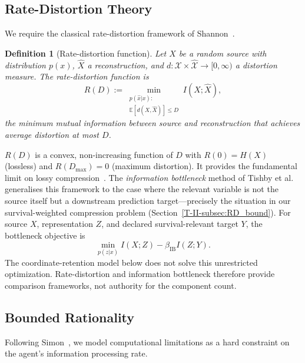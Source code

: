 \documentclass[12pt,a4paper,openany]{book}
\newtheorem{definition}[theorem]{Definition}
\begin{document}
\subsection{Rate-Distortion Theory}
\label{T-II-subsec:RD}

We require the classical rate-distortion framework
of Shannon~\cite{Shannon1959}.

\begin{definition}[Rate-distortion function]
\label{T-II-def:RD}
Let $X$ be a random source with distribution $p(x)$,
$\hat{X}$ a reconstruction, and
$d: \mathcal{X} \times \hat{\mathcal{X}} \to [0,\infty)$
a distortion measure.
The \emph{rate-distortion function} is
\begin{equation}
\label{T-II-eq:RD}
R(D) := \min_{\substack{p(\hat{x}|x):\\
  \mathbb{E}[d(X,\hat{X})] \leq D}} I(X; \hat{X}),
\end{equation}
the minimum mutual information between source and
reconstruction that achieves average distortion at most $D$.
\end{definition}

$R(D)$ is a convex, non-increasing function of $D$ with
$R(0) = H(X)$ (lossless) and
$R(D_{\max}) = 0$ (maximum distortion).
It provides the fundamental limit on lossy
compression~\cite{CoverThomas2006}.
The \emph{information bottleneck} method of
Tishby et al.~\cite{Tishby2000} generalises this framework
to the case where the relevant variable is not the source
itself but a downstream prediction target---precisely the
situation in our survival-weighted compression problem
(Section~\ref{T-II-subsec:RD_bound}).
For source $X$, representation $Z$, and declared survival-relevant
target $Y$, the bottleneck objective is
\begin{equation}
\min_{p(z|x)} I(X;Z)-\beta_{\mathrm{IB}} I(Z;Y).
\end{equation}
The coordinate-retention model below does not solve this unrestricted
optimization.  Rate-distortion and information bottleneck therefore
provide comparison frameworks, not authority for the component count.

\subsection{Bounded Rationality}
\label{T-II-subsec:bounded}

Following Simon~\cite{Simon1955}, we model computational
limitations as a hard constraint on the agent's information
processing rate.
\end{document}
